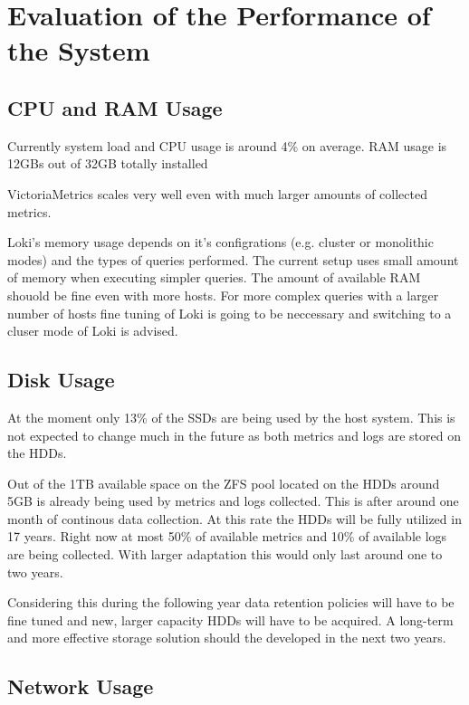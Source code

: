 \section{Evaluation of the Performance of the System}

\subsection{CPU and RAM Usage}

Currently system load and CPU usage is around 4\% on average. RAM usage is
12GBs out of 32GB totally installed

VictoriaMetrics scales very well even with much larger amounts of collected
metrics.

Loki's memory usage depends on it's configrations (e.g. cluster or monolithic
modes) and the types of queries performed. The current setup uses small amount
of memory when executing simpler queries. The amount of available RAM shouold
be fine even with more hosts. For more complex queries with a larger number of
hosts fine tuning of Loki is going to be neccessary and switching to a cluser
mode of Loki is advised.

\subsection{Disk Usage}

At the moment only 13\% of the SSDs are being used by the host system. This is
not expected to change much in the future as both metrics and logs are stored
on the HDDs.

Out of the 1TB available space on the ZFS pool located on the HDDs around 5GB
is already being used by metrics and logs collected. This is after around one
month of continous data collection. At this rate the HDDs will be fully
utilized in 17 years. Right now at most 50\% of available metrics and 10\% of
available logs are being collected. With larger adaptation this would only last
around one to two years.

Considering this during the following year data retention policies will have to
be fine tuned and new, larger capacity HDDs will have to be acquired. A
long-term and more effective storage solution should the developed in the next
two years.

\subsection{Network Usage}

